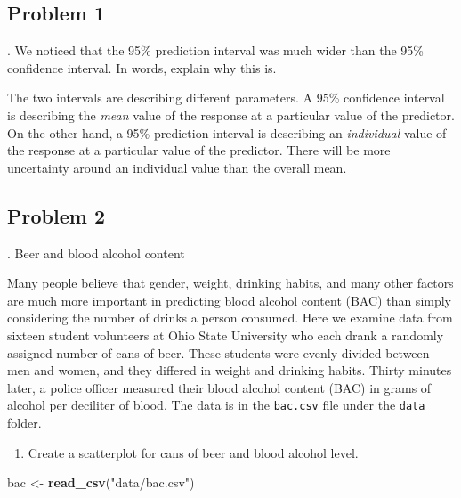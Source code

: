 \documentclass[
]{book}
\newenvironment{Shaded}{\begin{snugshade}}{\end{snugshade}}
\newcommand{\KeywordTok}[1]{\textcolor[rgb]{0.13,0.29,0.53}{\textbf{#1}}}
\newcommand{\NormalTok}[1]{#1}
\newcommand{\StringTok}[1]{\textcolor[rgb]{0.31,0.60,0.02}{#1}}
\providecommand{\tightlist}{%
  \setlength{\itemsep}{0pt}\setlength{\parskip}{0pt}}
\begin{document}
\hypertarget{problem-1-26}{%
\subsection{Problem 1}\label{problem-1-26}}

. We noticed that the 95\% prediction interval was much wider than the 95\% confidence interval. In words, explain why this is.

The two intervals are describing different parameters. A 95\% confidence interval is describing the \emph{mean} value of the response at a particular value of the predictor. On the other hand, a 95\% prediction interval is describing an \emph{individual} value of the response at a particular value of the predictor. There will be more uncertainty around an individual value than the overall mean.

\hypertarget{problem-2-24}{%
\subsection{Problem 2}\label{problem-2-24}}

. Beer and blood alcohol content

Many people believe that gender, weight, drinking habits, and many other factors are much more important in predicting blood alcohol content (BAC) than simply considering the number of drinks a person consumed. Here we examine data from sixteen student volunteers at Ohio State University who each drank a randomly assigned number of cans of beer. These students were evenly divided between men and women, and they differed in weight and drinking habits. Thirty minutes later, a police officer measured their blood alcohol content (BAC) in grams of alcohol per deciliter of blood. The data is in the \texttt{bac.csv} file under the \texttt{data} folder.

\begin{enumerate}
\def\labelenumi{\alph{enumi}.}
\tightlist
\item
  Create a scatterplot for cans of beer and blood alcohol level.
\end{enumerate}

\begin{Shaded}
\begin{Highlighting}[]
\NormalTok{bac <-}\StringTok{ }\KeywordTok{read_csv}\NormalTok{(}\StringTok{"data/bac.csv"}\NormalTok{)}
\end{Highlighting}
\end{Shaded}
\end{document}
